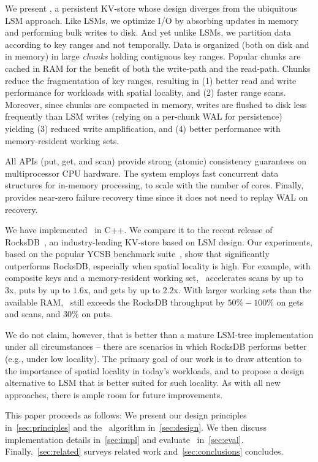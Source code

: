 We present \sys, a persistent KV-store whose design diverges from the ubiquitous LSM approach.  
Like  LSMs,  we optimize I/O by absorbing updates in memory and performing bulk writes to disk. 
And yet unlike LSMs, we partition data according to key ranges and not temporally.
Data is  organized (both on disk and in memory) in large \emph{chunks} holding contiguous key ranges.
Popular chunks are cached in RAM for the benefit of  both the write-path and the read-path.
Chunks reduce the fragmentation of key ranges, resulting in 
(1) better read and write performance for workloads with spatial locality,  and
(2) faster range scans. 
Moreover, since chunks  are compacted in memory, writes are 
flushed to disk less frequently than LSM writes (relying on a per-chunk WAL for persistence)
yielding 
(3) reduced write amplification, and 
(4) better performance with memory-resident working sets.

All \sys\/ APIs (put, get, and scan) provide strong (atomic) consistency guarantees on multiprocessor CPU hardware. 
The system employs fast concurrent data structures for in-memory processing, to scale with the number of cores. 
Finally, \sys\/ provides near-zero failure recovery time since it does not need to replay WAL on recovery.

We have implemented \sys\ in C++. We compare it to the recent release of RocksDB~\cite{RocksDB}, 
an industry-leading KV-store  based on LSM design. Our experiments, based on the popular 
YCSB benchmark suite~\cite{YCSB}, show that \sys\/ significantly outperforms  RocksDB, 
especially when spatial  locality is high. 
For example, with composite keys and a memory-resident working set, \sys\  accelerates scans 
by up to 3x, puts by up to $1.6$x, and gets by up to $2.2$x. With larger working sets than the 
available RAM, \sys\ still exceeds the RocksDB throughput by $50\% - 100\%$ on gets  and scans, 
and $30\%$ on puts. 

We do not claim, however, that \sys\/ is better than a mature LSM-tree implementation
under all circumstances -- there are scenarios in which RocksDB performs better (e.g., under low locality). 
The primary goal of our work is to draw attention to the importance of spatial locality in 
today's workloads, and to propose a design alternative to LSM that is better suited for such locality. 
As with all new approaches, there is ample  room for future improvements. 
 
 This paper proceeds as follows:
We present our design principles in~\cref{sec:principles} and  the \sys\ algorithm 
in~\cref{sec:design}. We then discuss implementation details in~\cref{sec:impl} and evaluate 
\sys\ in~\cref{sec:eval}.  Finally,~\cref{sec:related}   surveys related work and~\cref{sec:conclusions}
concludes. 
